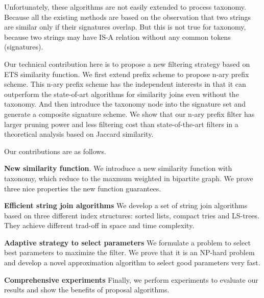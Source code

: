Unfortunately, these algorithms are not easily extended to process taxonomy. Because all the existing methods are based on the observation that two strings are similar only if their signatures overlap. But this is not true for taxonomy, because two strings may have IS-A relation without any common tokens (signatures).

Our technical contribution here is to propose a new filtering strategy based on ETS similarity function. We first extend prefix scheme to propose n-ary prefix scheme. This n-ary prefix scheme has the independent interests in that it can outperform the state-of-art algorithms  for similarity joins even without the taxonomy. And then introduce the taxonomy node into the signature set and generate a composite signature scheme. We show that our n-ary prefix
filter has larger pruning power and less filtering cost
than state-of-the-art filters in a theoretical analysis based on Jaccard similarity.

\smallskip

Our contributions are as follows.


\noindent \textbf{New similarity function}. We introduce a new similarity function with taxonomy, which reduce to the maxmum weighted in bipartite graph. We prove three nice properties the new function guarantees.

\noindent \textbf{Efficient string join algorithms} We develop a set of string join algorithms based on three different index structures: sorted lists, compact tries and LS-trees. They achieve different trad-off in space and time complexity.

\noindent \textbf{Adaptive strategy to select parameters} We formulate a problem to select best parameters to maximize the filter. We prove that it is an NP-hard problem and develop a novel  approximation algorithm to select good parameters very fast.

\noindent \textbf{Comprehensive experiments} Finally, we perform experiments to evaluate our results and show the benefits of proposal algorithms.


%
%
%
%



